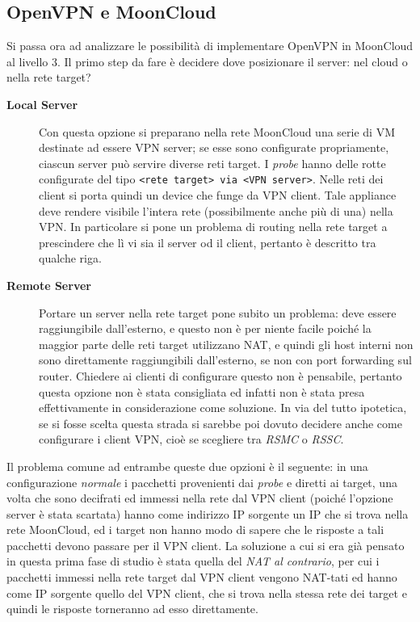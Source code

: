 \subsection{OpenVPN e MoonCloud}
Si passa ora ad analizzare le possibilità di implementare OpenVPN in MoonCloud al livello 3. Il primo step
da fare è decidere dove posizionare il server: nel cloud o nella rete target?
\begin{description}
	\item[\textbf{Local Server}]Con questa opzione si preparano nella rete MoonCloud una serie
	di VM destinate ad essere VPN server; se esse sono configurate propriamente, ciascun server
	può servire diverse reti target. I \textit{probe}
	hanno delle rotte configurate del tipo \texttt{<rete target> via <VPN server>}.
	Nelle reti dei client si porta quindi un device che funge da VPN client.
	Tale appliance deve rendere visibile l'intera rete (possibilmente anche più di una) nella VPN. In
	particolare si pone un problema di routing nella rete target a prescindere che lì vi sia
	il server od il client, pertanto è descritto tra qualche riga.
	\item[\textbf{Remote Server}]Portare un server nella rete target pone subito un problema: deve
	essere raggiungibile dall'esterno, e questo non è per niente facile poiché la maggior parte
	delle reti target utilizzano NAT, e quindi gli host interni non sono direttamente raggiungibili
	dall'esterno, se non con port forwarding sul router. Chiedere ai clienti di configurare
	questo non è pensabile, pertanto questa opzione non è stata consigliata ed infatti
	non è stata presa effettivamente in considerazione come soluzione.
	In via del tutto ipotetica, se si fosse scelta questa strada si sarebbe poi
	dovuto decidere anche come configurare i client VPN, cioè se scegliere tra \textit{RSMC}
	o \textit{RSSC}.
\end{description}
Il problema comune ad entrambe queste due opzioni è il seguente: in una configurazione
\textit{normale} i pacchetti provenienti dai \textit{probe} e diretti ai target, una volta che
sono decifrati ed immessi nella rete dal VPN client (poiché l'opzione server
è stata scartata) hanno come indirizzo IP sorgente un IP che si trova nella rete MoonCloud,
ed i target non hanno modo di sapere che le risposte a tali pacchetti devono passare
per il VPN client. La soluzione a cui si era già pensato in questa prima fase di studio
è stata quella del \textit{NAT al contrario}, per cui i pacchetti immessi nella rete
target dal VPN client vengono NAT-tati ed hanno come IP sorgente quello del VPN
client, che si trova nella stessa rete dei target e quindi le risposte torneranno
ad esso direttamente.

